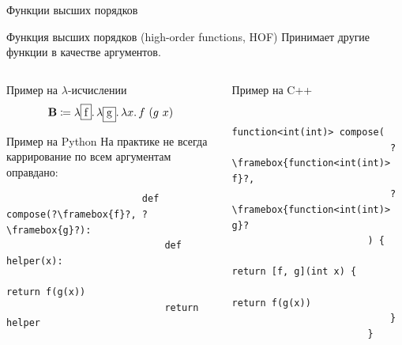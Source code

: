     \begin{frame}[fragile]{Функции высших порядков}
        \begin{block}{Функция высших порядков (high-order functions, HOF)}
            Принимает другие функции в качестве аргументов.
        \end{block}
        \vspace{-1em}
        \begin{columns}[onlytextwidth]
            \begin{column}[t]{0.485\textwidth}
                \begin{block}{Пример на $\lambda$-исчислении}
                    \[\comb{B} \termdef \lambda \framebox{f} \ldotp \lambda \framebox{g} \ldotp \lambda x\ldotp f~(g~x)\]
                \end{block}
                \pause
                \begin{block}{Пример на Python}
                    На практике не всегда каррирование по всем аргументам оправдано:
                    \begin{verbatim}
                        def compose(?\framebox{f}?, ?\framebox{g}?):
                            def helper(x):
                                return f(g(x))
                            return helper
                    \end{verbatim}
                \end{block}
            \end{column}\hfill
            \pause%
            \begin{column}[t]{0.485\textwidth}
                \begin{block}{Пример на C++}
                    \begin{verbatim}
                        function<int(int)> compose(
                            ?\framebox{function<int(int)> f}?,
                            ?\framebox{function<int(int)> g}?
                        ) {
                            return [f, g](int x) {
                                return f(g(x))
                            }
                        }
                    \end{verbatim}
                \end{block}
            \end{column}
        \end{columns}
    \end{frame}

